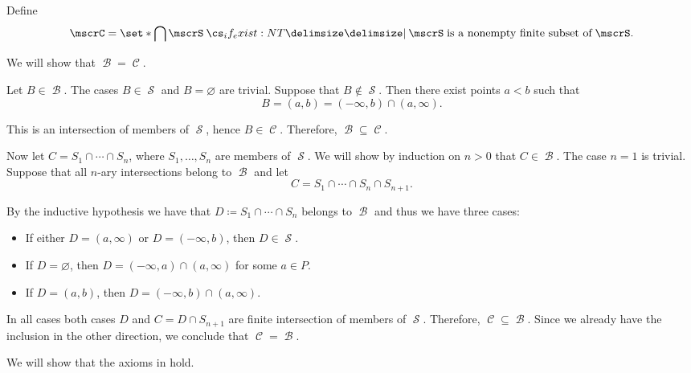 \begin{defproof}
   Define
  \begin{equation*}
    \mscrC = \set*{ \bigcap \mscrS \given* \mscrS \T{is a nonempty finite subset of} \mscrS }.
  \end{equation*}

  We will show that \( \mscrB = \mscrC \).

  Let \( B \in \mscrB \). The cases \( B \in \mscrS \) and \( B = \varnothing \) are trivial. Suppose that \( B \not\in \mscrS \). Then there exist points \( a < b \) such that
  \begin{equation*}
    B = (a, b) = (-\infty, b) \cap (a, \infty).
  \end{equation*}

  This is an intersection of members of \( \mscrS \), hence \( B \in \mscrC \). Therefore, \( \mscrB \subseteq \mscrC \).

  Now let \( C = S_1 \cap \cdots \cap S_n \), where \( S_1, \ldots, S_n \) are members of \( \mscrS \). We will show by induction on \( n > 0 \) that \( C \in \mscrB \). The case \( n = 1 \) is trivial. Suppose that all \( n \)-ary intersections belong to \( \mscrB \) and let
  \begin{equation*}
    C = S_1 \cap \cdots \cap S_n \cap S_{n+1}.
  \end{equation*}

  By the inductive hypothesis we have that \( D \coloneqq S_1 \cap \cdots \cap S_n \) belongs to \( \mscrB \) and thus we have three cases:
  \begin{itemize}
    \item If either \( D = (a, \infty) \) or \( D = (-\infty, b) \), then \( D \in \mscrS \).
    \item If \( D = \varnothing \), then \( D = (-\infty, a) \cap (a, \infty) \) for some \( a \in P \).
    \item If \( D = (a, b) \), then \( D = (-\infty, b) \cap (a, \infty) \).
  \end{itemize}

  In all cases both cases \( D \) and \( C = D \cap S_{n+1} \) are finite intersection of members of \( \mscrS \). Therefore, \( \mscrC \subseteq \mscrB \). Since we already have the inclusion in the other direction, we conclude that \( \mscrC = \mscrB \).

   We will show that the axioms in  hold.


\end{defproof}
